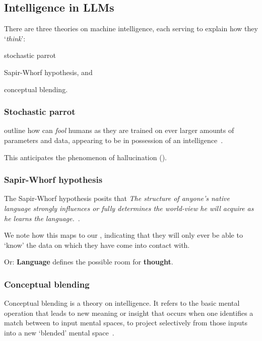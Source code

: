 
\subsection{Intelligence in LLMs}\label{sec:llmIntelligence}

There are three theories on machine intelligence, each serving to
explain how they `\textit{think}': \begin{inparaenum}
    \item stochastic parrot
    \item Sapir-Whorf hypothesis,
    and
    \item conceptual blending.
\end{inparaenum}

\subsubsection{Stochastic parrot}\label{sec:llmParrot}

\citeauthor{parrot} outline how  can \textit{fool} humans as they
are trained on ever larger amounts of parameters and data, appearing to be in possession of an
intelligence~\cite[610-611]{parrot}.

This anticipates the phenomenon of hallucination ().

\subsubsection{Sapir-Whorf hypothesis}

The Sapir-Whorf hypothesis posits that  \textit{The structure of anyone’s native
    language strongly influences or fully determines the world-view he will acquire
    as he learns the language.}~\cite[128]{sapirWhorf}.

We note how this maps to our , indicating that they will only ever
be able to `know' the data on which they have come into contact with.

Or: \textbf{Language} defines the possible room for \textbf{thought}.


\subsubsection{Conceptual blending}

Conceptual blending is a theory on intelligence. It refers to the basic mental
operation that leads to new meaning or insight that occurs when one identifies
a match between to input mental spaces, to project selectively from those inputs
into a new `blended' mental space~\cite[57-58]{conceptBlending}.

